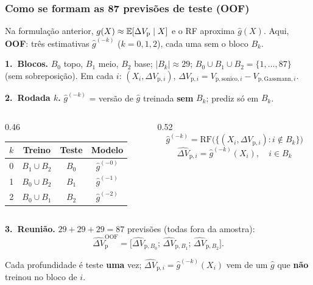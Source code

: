 \documentclass[aspectratio=169,10pt]{beamer}
\begin{document}
\begin{frame}[shrink=5]
  \frametitle{Como se formam as 87 previsões de teste (OOF)}
  \scriptsize
  Na formulação anterior, $g(X)\approx\mathbb{E}[\Delta V_{\mathrm{p}}\mid X]$ e o RF
  aproxima $\widehat{g}(X)$.
  Aqui, \textbf{OOF}: três estimativas
  $\widehat{g}^{(-k)}$ ($k=0,1,2$), cada uma sem o bloco $B_k$.
  \vspace{0.06cm}

  \textbf{1.~Blocos.}
  $B_0$ topo, $B_1$ meio, $B_2$ base;
  $\lvert B_k\rvert\approx 29$;
  $B_0\cup B_1\cup B_2=\{1,\ldots,87\}$ (sem sobreposição).
  Em cada $i$: $(X_i,\Delta V_{\mathrm{p},i})$,
  $\Delta V_{\mathrm{p},i}
  =V_{\mathrm{p,sonico},i}-V_{\mathrm{p,Gassmann},i}$.
  \vspace{0.05cm}

  \textbf{2.~Rodada $k$.}
  $\widehat{g}^{(-k)}$ = versão de $\widehat{g}$ treinada \textbf{sem}
  $B_k$; prediz só em $B_k$.
  \vspace{0.03cm}
  \begin{columns}[T,onlytextwidth]
    \begin{column}{0.46\textwidth}
      \centering
      \setlength{\tabcolsep}{3pt}
      \begin{tabular}{cccc}
        \toprule
        $k$ & Treino & Teste & Modelo \\
        \midrule
        0 & $B_1\cup B_2$ & $B_0$ & $\widehat{g}^{(-0)}$ \\
        1 & $B_0\cup B_2$ & $B_1$ & $\widehat{g}^{(-1)}$ \\
        2 & $B_0\cup B_1$ & $B_2$ & $\widehat{g}^{(-2)}$ \\
        \bottomrule
      \end{tabular}
    \end{column}
    \begin{column}{0.52\textwidth}
      \[
        \widehat{g}^{(-k)}
        =\mathrm{RF}\bigl(
          \{(X_i,\Delta V_{\mathrm{p},i}):i\notin B_k\}
        \bigr)
      \]
      \[
        \widehat{\Delta V}_{\mathrm{p},i}
        =\widehat{g}^{(-k)}(X_i),\quad i\in B_k
      \]
    \end{column}
  \end{columns}
  \vspace{0.03cm}

  \textbf{3.~Reunião.}
  $29+29+29=87$ previsões (todas fora da amostra):
  \[
    \widehat{\Delta V}_{\mathrm{p}}^{\mathrm{OOF}}
    =
    \bigl[
      \widehat{\Delta V}_{\mathrm{p},B_0};\,
      \widehat{\Delta V}_{\mathrm{p},B_1};\,
      \widehat{\Delta V}_{\mathrm{p},B_2}
    \bigr].
  \]
  \vspace{0.02cm}
  \begin{exampleblock}{}
    \scriptsize
    Cada profundidade é teste \textbf{uma} vez;
    $\widehat{\Delta V}_{\mathrm{p},i}=\widehat{g}^{(-k)}(X_i)$ vem de um
    $\widehat{g}$ que \textbf{não} treinou no bloco de $i$.
  \end{exampleblock}
\end{frame}
\end{document}
